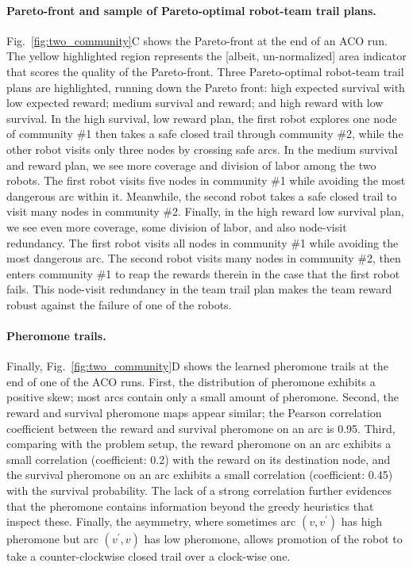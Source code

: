 \documentclass[fleqn,10pt,lineno]{wlpeerj}
\begin{document}
\paragraph{Pareto-front and sample of Pareto-optimal robot-team trail plans.}
Fig.~\ref{fig:two_community}C shows the Pareto-front at the end of an ACO run. The yellow highlighted region represents the [albeit, un-normalized] area indicator that scores the quality of the Pareto-front. 
Three Pareto-optimal robot-team trail plans are highlighted, running down the Pareto front: high expected survival with low expected reward; medium survival and reward; and high reward with low survival. 
    In the high survival, low reward plan, the first robot explores one node of community \#1 then takes a safe closed trail through community \#2, while the other robot visits only three nodes by crossing safe arcs.
   In the medium survival and reward plan, we see more coverage and division of labor among the two robots. The first robot visits five nodes in community \#1 while avoiding the most dangerous arc within it. Meanwhile, the second robot takes a safe closed trail to visit many nodes in community \#2.
   Finally, in the high reward low survival plan, we see even more coverage, some division of labor, and also node-visit redundancy. The first robot visits all nodes in community \#1 while avoiding the most dangerous arc. The second robot visits many nodes in community \#2, then enters community \#1 to reap the rewards therein in the case that the first robot fails. This node-visit redundancy in the team trail plan makes the team reward robust against the failure of one of the robots.

\paragraph{Pheromone trails.}
Finally, Fig.~\ref{fig:two_community}D shows the learned pheromone trails at the end of one of the ACO runs.
First, the distribution of pheromone exhibits a positive skew; most arcs contain only a small amount of pheromone.   
Second, the reward and survival pheromone maps appear similar; the Pearson correlation coefficient between the reward and survival pheromone on an arc is 0.95. 
Third, comparing with the problem setup, the reward pheromone on an arc exhibits a small correlation (coefficient: 0.2) with the reward on its destination node, and the survival pheromone on an arc exhibits a small correlation (coefficient: 0.45) with the survival probability. The lack of a strong correlation further evidences that the pheromone contains information beyond the greedy heuristics that inspect these.
Finally, the asymmetry, where sometimes arc $(v, v^\prime)$ has high pheromone but arc $(v^\prime, v)$ has low pheromone, allows promotion of the robot to take a counter-clockwise closed trail over a clock-wise one.
\end{document}
